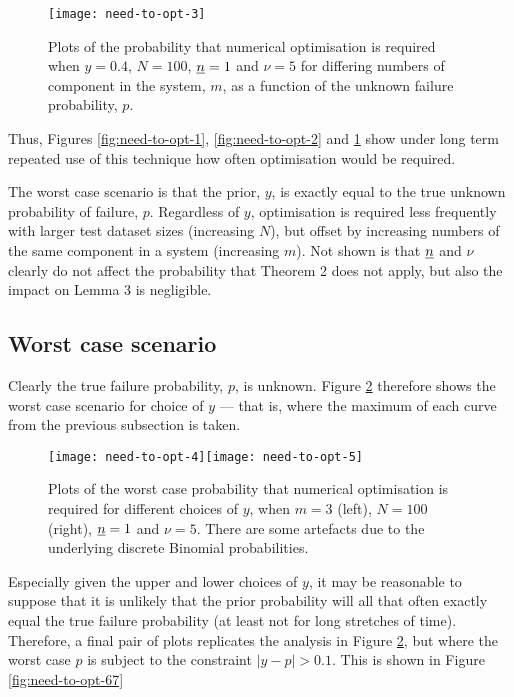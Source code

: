 \documentclass[12pt, a4paper]{elsarticle}
\begin{document}
\begin{figure}
\texttt{[image: need-to-opt-3]}
\caption{Plots of the probability that numerical optimisation is required when $y=0.4$, $N=100$, $\underline{n}=1$ and $\nu=5$ for differing numbers of component in the system, $m$, as a function of the unknown failure probability, $p$.}
\label{fig:need-to-opt-3}
\end{figure}

Thus, Figures \ref{fig:need-to-opt-1}, \ref{fig:need-to-opt-2} and \ref{fig:need-to-opt-3} show under long term repeated use of this technique how often optimisation would be required.

The worst case scenario is that the prior, $y$, is exactly equal to the true unknown probability of failure, $p$.  Regardless of $y$, optimisation is required less frequently with larger test dataset sizes (increasing $N$), but offset by increasing numbers of the same component in a system (increasing $m$).  Not shown is that $\underline{n}$ and $\nu$ clearly do not affect the probability that Theorem 2 does not apply, but also the impact on Lemma 3 is negligible.

\subsection{Worst case scenario}

Clearly the true failure probability, $p$, is unknown.  Figure \ref{fig:need-to-opt-45} therefore shows the worst case scenario for choice of $y$ --- that is, where the maximum of each curve from the previous subsection is taken.

\begin{figure}
\texttt{[image: need-to-opt-4]}\texttt{[image: need-to-opt-5]}
\caption{Plots of the worst case probability that numerical optimisation is required for different choices of $y$, when $m=3$ (left), $N=100$ (right), $\underline{n}=1$ and $\nu=5$.  There are some artefacts due to the underlying discrete Binomial probabilities.}
\label{fig:need-to-opt-45}
\end{figure}

Especially given the upper and lower choices of $y$, it may be reasonable to suppose that it is unlikely that the prior probability will all that often exactly equal the true failure probability (at least not for long stretches of time).  Therefore, a final pair of plots replicates the analysis in Figure \ref{fig:need-to-opt-45}, but where the worst case $p$ is subject to the constraint $|y-p|>0.1$.  This is shown in Figure \ref{fig:need-to-opt-67}
\end{document}
